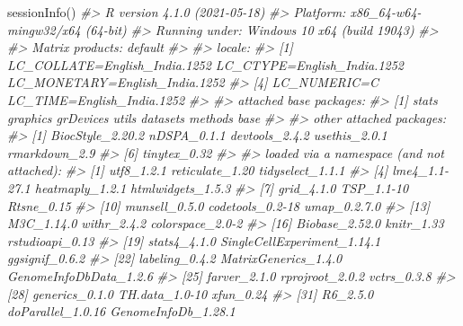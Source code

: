\documentclass[]{article}
\newcommand{\hlcom}[1]{\textcolor[rgb]{0.502,0.502,0.502}{\textit{#1}}}%
\newcommand{\hlstd}[1]{\textcolor[rgb]{0.251,0.251,0.251}{#1}}%
\newenvironment{Shaded}{\begin{myshaded}}{\end{myshaded}}
\newcommand{\CommentTok}[1]{\hlcom{#1}}
\newcommand{\FunctionTok}[1]{\hlstd{#1}}
\newcommand{\NormalTok}[1]{\hlstd{#1}}
\begin{document}
\begin{Shaded}
\begin{Highlighting}[]
\FunctionTok{sessionInfo}\NormalTok{()}
\CommentTok{\#\textgreater{} R version 4.1.0 (2021{-}05{-}18)}
\CommentTok{\#\textgreater{} Platform: x86\_64{-}w64{-}mingw32/x64 (64{-}bit)}
\CommentTok{\#\textgreater{} Running under: Windows 10 x64 (build 19043)}
\CommentTok{\#\textgreater{} }
\CommentTok{\#\textgreater{} Matrix products: default}
\CommentTok{\#\textgreater{} }
\CommentTok{\#\textgreater{} locale:}
\CommentTok{\#\textgreater{} [1] LC\_COLLATE=English\_India.1252  LC\_CTYPE=English\_India.1252    LC\_MONETARY=English\_India.1252}
\CommentTok{\#\textgreater{} [4] LC\_NUMERIC=C                   LC\_TIME=English\_India.1252    }
\CommentTok{\#\textgreater{} }
\CommentTok{\#\textgreater{} attached base packages:}
\CommentTok{\#\textgreater{} [1] stats     graphics  grDevices utils     datasets  methods   base     }
\CommentTok{\#\textgreater{} }
\CommentTok{\#\textgreater{} other attached packages:}
\CommentTok{\#\textgreater{} [1] BiocStyle\_2.20.2 nDSPA\_0.1.1      devtools\_2.4.2   usethis\_2.0.1    rmarkdown\_2.9   }
\CommentTok{\#\textgreater{} [6] tinytex\_0.32    }
\CommentTok{\#\textgreater{} }
\CommentTok{\#\textgreater{} loaded via a namespace (and not attached):}
\CommentTok{\#\textgreater{}   [1] utf8\_1.2.1                  reticulate\_1.20             tidyselect\_1.1.1           }
\CommentTok{\#\textgreater{}   [4] lme4\_1.1{-}27.1               heatmaply\_1.2.1             htmlwidgets\_1.5.3          }
\CommentTok{\#\textgreater{}   [7] grid\_4.1.0                  TSP\_1.1{-}10                  Rtsne\_0.15                 }
\CommentTok{\#\textgreater{}  [10] munsell\_0.5.0               codetools\_0.2{-}18            umap\_0.2.7.0               }
\CommentTok{\#\textgreater{}  [13] M3C\_1.14.0                  withr\_2.4.2                 colorspace\_2.0{-}2           }
\CommentTok{\#\textgreater{}  [16] Biobase\_2.52.0              knitr\_1.33                  rstudioapi\_0.13            }
\CommentTok{\#\textgreater{}  [19] stats4\_4.1.0                SingleCellExperiment\_1.14.1 ggsignif\_0.6.2             }
\CommentTok{\#\textgreater{}  [22] labeling\_0.4.2              MatrixGenerics\_1.4.0        GenomeInfoDbData\_1.2.6     }
\CommentTok{\#\textgreater{}  [25] farver\_2.1.0                rprojroot\_2.0.2             vctrs\_0.3.8                }
\CommentTok{\#\textgreater{}  [28] generics\_0.1.0              TH.data\_1.0{-}10              xfun\_0.24                  }
\CommentTok{\#\textgreater{}  [31] R6\_2.5.0                    doParallel\_1.0.16           GenomeInfoDb\_1.28.1        }

\end{Highlighting}
\end{Shaded}
\end{document}
